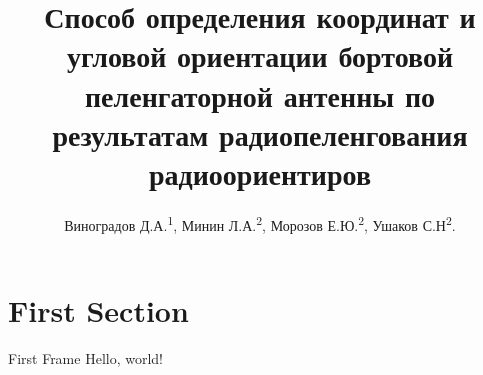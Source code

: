\documentclass[russian,hyperref={unicode}]{beamer}
\title{Способ определения координат и угловой ориентации бортовой пеленгаторной антенны по результатам радиопеленгования радиоориентиров}
\institute
{
  \textsuperscript{1}Военно-воздушная академия им. проф. Н.Е.Жуковского и Ю.А.Гагарина\\
	\textsuperscript{2}Воронежский Государственный Университет
}
\author
{
  Виноградов Д.А.\textsuperscript{1}, Минин Л.А.\textsuperscript{2}, Морозов Е.Ю.\textsuperscript{2}, Ушаков С.Н\textsuperscript{2}.
}
\begin{document}
  \maketitle
  \section{First Section}
  \begin{frame}{First Frame}
    Hello, world!
  \end{frame}
\end{document}
